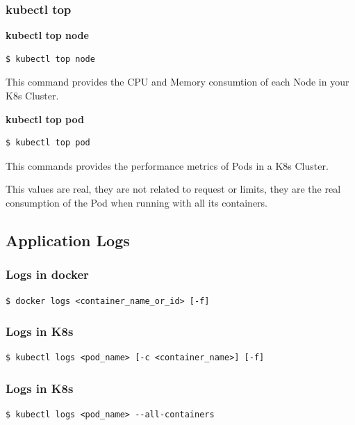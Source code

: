 \documentclass{article}
\newenvironment{blocktemplate}[1]{%
    \tcolorbox[beamer,%
    noparskip,breakable,
    colframe=Blue,%
    colbacklower=LimeGreen!75!LightGreen,%
    title=#1]}%
    {\endtcolorbox}
\newenvironment{codetemplate}[1][]{%
  \mybasecolorbox[#1]
  \itshape
}{%
  \endmybasecolorbox
}
\begin{document}
\subsubsection{kubectl top}
\textbf{kubectl top node}
\begin{codetemplate}{}
\begin{verbatim}
$ kubectl top node
\end{verbatim}
\end{codetemplate}
This command provides the CPU and Memory consumtion of each Node in your K8s Cluster.

\textbf{kubectl top pod}
\begin{codetemplate}{}
\begin{verbatim}
$ kubectl top pod
\end{verbatim}
\end{codetemplate}
This commands provides the performance metrics of Pods in a K8s Cluster.

\begin{blocktemplate}{NOTE}
This values are real, they are not related to request or limits, they are the real consumption of the Pod when running with all its containers.
\end{blocktemplate}

\subsection{Application Logs}

\subsubsection{Logs in docker}
\begin{codetemplate}{}
\begin{verbatim}
$ docker logs <container_name_or_id> [-f]
\end{verbatim}
\end{codetemplate}

\subsubsection{Logs in K8s}
\begin{codetemplate}{}
\begin{verbatim}
$ kubectl logs <pod_name> [-c <container_name>] [-f]
\end{verbatim}
\end{codetemplate}

\subsubsection{Logs in K8s}
\begin{codetemplate}{}
\begin{verbatim}
$ kubectl logs <pod_name> --all-containers
\end{verbatim}
\end{codetemplate}
\end{document}
